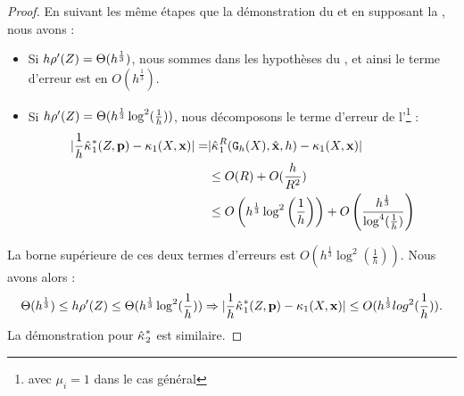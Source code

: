 \begin{proof}
  En suivant les même étapes que la démonstration du
   et en supposant la
  , nous avons :
  \begin{itemize}
    \item Si $h\rho'(Z) = \Theta(h^{\frac{1}{3}})$, nous sommes dans les hypothèses du , et ainsi le terme d'erreur est en $O(h^\frac{1}{3})$.
    \item Si $h\rho'(Z) = \Theta(h^{\frac{1}{3}} \log^2 (\frac{1}{h}))$,
    nous décomposons le terme d'erreur de
    l'\footnote{avec $\mu_i = 1$
    dans le cas général} :
    \begin{align}
      |\frac{1}{h}\hat{\kappa_{}}_{1}^{*}(Z, \mathbf{p}) - \kappa_{1}(X, \mathbf{x}) | =  &| \hat{\kappa_{}}_{1}^{R}(\mathtt{G}_{h}(X),\hat{\mathbf{x}},h) - \kappa_{1}(X,\mathbf{x}) |  \nonumber \\
      & \le O(R) + O( \frac{h}{R^2}) \\
      & \le O\left(h^{\frac{1}{3}} \log^2 \left(\frac{1}{h}\right)\right) + O\left( \frac{h^{\frac{1}{3}}}{\log^4 (\frac{1}{h})} \right)
    \end{align}
  \end{itemize}
  La borne supérieure de ces deux termes d'erreurs est $O\left(h^{\frac{1}{3}}
  \log^2 \left(\frac{1}{h}\right)\right)$. Nous avons alors :
  \begin{equation}
    \Theta(h^{\frac{1}{3}}) \le h{\rho'(Z)} \le \Theta(h^{\frac{1}{3}} \log^2 (\frac{1}{h})) \Rightarrow | \frac{1}{h}\hat{\kappa_{}}_{1}^{*}(Z, \mathbf{p}) - \kappa_{1}(X, \mathbf{x}) | \le O(h^{\frac{1}{3}} log^2({\frac{1}{h}})).
  \end{equation}
  La démonstration pour $\hat{\kappa_{}}_{2}^{*}$ est similaire.
\end{proof}
%
